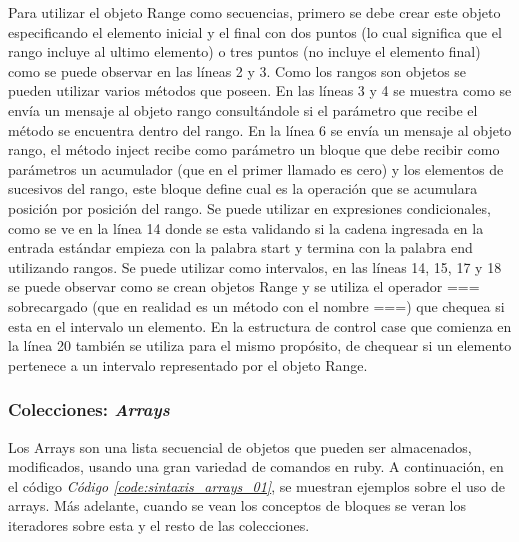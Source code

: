 \documentclass{article}
\newcommand{\refcode}[1]{\textit{Código \ref{#1}}}
\begin{document}
 
\bigskip

Para utilizar el objeto Range como secuencias, primero se debe crear este objeto especificando el elemento inicial y el final con dos puntos (lo cual significa que el rango incluye al ultimo elemento) o tres puntos (no incluye el elemento final) como se puede observar en las líneas 2 y 3. Como los rangos son objetos se pueden utilizar varios métodos que poseen. En las líneas 3 y 4 se muestra como se envía un mensaje al objeto rango consultándole si el parámetro que recibe el método se encuentra dentro del rango. En la línea 6 se envía un mensaje al objeto rango, el método inject recibe como parámetro un bloque que debe recibir como parámetros un acumulador (que en el primer llamado es cero) y los elementos de sucesivos del rango, este bloque define cual es la operación que se acumulara posición por posición del rango.
Se puede utilizar en expresiones condicionales, como se ve en la línea 14 donde se esta validando si la cadena ingresada en la entrada estándar empieza con la palabra start y termina con la palabra end  utilizando rangos.
Se puede utilizar como intervalos, en las líneas 14, 15, 17 y 18 se puede observar como se crean objetos Range y se utiliza el operador === sobrecargado (que en realidad es un método con el nombre ===) que chequea si esta en el intervalo un elemento. En la estructura de control case que comienza en la línea 20 también se utiliza para el mismo propósito, de chequear si un elemento pertenece a un intervalo representado por el objeto Range.



\subsubsection{Colecciones: \textit{Arrays}}
Los Arrays son una lista secuencial de objetos que pueden ser almacenados,  modificados,  usando una gran variedad de comandos en ruby.  
A continuación, en el código \refcode{code:sintaxis_arrays_01}, se muestran ejemplos sobre el uso de arrays. Más adelante, cuando se vean los conceptos de bloques se veran los iteradores sobre esta y el resto de las colecciones.

 
\bigskip
\end{document}
